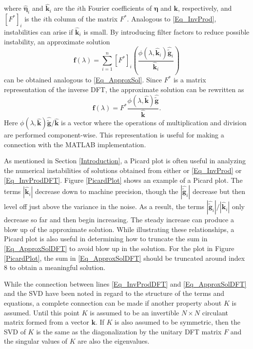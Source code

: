 \documentclass[12pt]{article}
\newcommand{\gnoise}{\widetilde{\mathbf{g}}}
\newcommand{\kdis}{\mathbf{k}}
\newcommand{\kmat}{K}	%
\newcommand{\fdis}{\mathbf{f}}
\newcommand{\regparam}{\lambda}
\newcommand{\filt}{\phi}
\newcommand{\noise}{\bm{\eta}}	%
\begin{document}
where $\widehat{\noise}_i$ and $\widehat{\kdis}_i$ are the $i$th Fourier coefficients of $\noise$ and $\kdis$, respectively, and $[F^*]_i$ is the $i$th column of the matrix $F^*$. Analogous to \eqref{Eq_InvProd}, instabilities can arise if $\widehat{\kdis}_i$ is small. By introducing filter factors to reduce possible instability, an approximate solution
\begin{equation}
\fdis(\regparam) = \sum_{i = 1}^n [F^*]_i\left(\frac{\filt(\regparam,\widehat{\kdis}_i)\widehat{\gnoise}_i}{\widehat{\kdis}_i}\right)
\label{Eq_ApproxSolDFT}
\end{equation}
can be obtained analogous to \eqref{Eq_ApproxSol}. 
Since $F^*$ is a matrix representation of the inverse DFT, the approximate solution can be rewritten as
\[\fdis(\regparam) = F^* \frac{\filt(\regparam,\widehat{\kdis})\widehat{\gnoise}}{\widehat{\kdis}}.\]
Here $\filt(\regparam,\widehat{\kdis})\widehat{\gnoise}/{\widehat{\kdis}}$ is a vector where the operations of multiplication and division are performed component-wise. This representation is useful for making a connection with the MATLAB implementation. \par
As mentioned in Section \ref{Introduction}, a Picard plot is often useful in analyzing the numerical instabilities of solutions obtained from either or \eqref{Eq_InvProd} or \eqref{Eq_InvProdDFT}. Figure \ref{PicardPlot} shows an example of a Picard plot. The terms $|\widehat{\kdis}_i|$ decrease down to machine precision, though the $|\widehat{\gnoise}_i|$ decrease but then level off just above the variance in the noise. As a result, the terms $|\widehat{\gnoise}_i|/|\widehat{\kdis}_i|$ only decrease so far and then begin increasing. The steady increase can produce a blow up of the approximate solution. While illustrating these relationships, a Picard plot is also useful in determining how to truncate the sum in \eqref{Eq_ApproxSolDFT} to avoid blow up in the solution. For the plot in Figure \ref{PicardPlot}, the sum in \eqref{Eq_ApproxSolDFT} should be truncated around index 8 to obtain a meaningful solution. \par 
While the connection between lines \eqref{Eq_InvProdDFT} and \eqref{Eq_ApproxSolDFT} and the SVD have been noted in regard to the structure of the terms and equations, a complete connection can be made if another property about $\kmat$ is assumed. Until this point $\kmat$ is assumed to be an invertible $N \times N$ circulant matrix formed from a vector $\kdis$. If $\kmat$ is also assumed to be symmetric, then the SVD of $\kmat$ is the same as the diagonalization by the unitary DFT matrix $F$ and the singular values of $\kmat$ are also the eigenvalues. 
\end{document}
